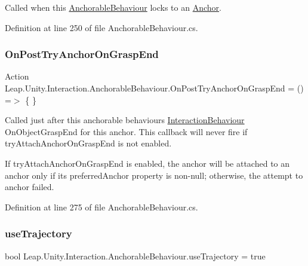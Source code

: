 Called when this \mbox{\hyperlink{class_leap_1_1_unity_1_1_interaction_1_1_anchorable_behaviour}{Anchorable\+Behaviour}} locks to an \mbox{\hyperlink{class_leap_1_1_unity_1_1_interaction_1_1_anchor}{Anchor}}. 



Definition at line 250 of file Anchorable\+Behaviour.\+cs.

\mbox{\label{class_leap_1_1_unity_1_1_interaction_1_1_anchorable_behaviour_a29a27e344ab1105d4fa8657de3fe5dab}} 
\subsubsection{\texorpdfstring{OnPostTryAnchorOnGraspEnd}{OnPostTryAnchorOnGraspEnd}}
{\footnotesize\ttfamily Action Leap.\+Unity.\+Interaction.\+Anchorable\+Behaviour.\+On\+Post\+Try\+Anchor\+On\+Grasp\+End = () =$>$ \{ \}}



Called just after this anchorable behaviour\textquotesingle{}s \mbox{\hyperlink{class_leap_1_1_unity_1_1_interaction_1_1_interaction_behaviour}{Interaction\+Behaviour}} On\+Object\+Grasp\+End for this anchor. This callback will never fire if try\+Attach\+Anchor\+On\+Grasp\+End is not enabled. 

If try\+Attach\+Anchor\+On\+Grasp\+End is enabled, the anchor will be attached to an anchor only if its preferred\+Anchor property is non-\/null; otherwise, the attempt to anchor failed. 

Definition at line 275 of file Anchorable\+Behaviour.\+cs.

\mbox{\label{class_leap_1_1_unity_1_1_interaction_1_1_anchorable_behaviour_ab05fef36f601748387b8a283433909f3}} 
\subsubsection{\texorpdfstring{useTrajectory}{useTrajectory}}
{\footnotesize\ttfamily bool Leap.\+Unity.\+Interaction.\+Anchorable\+Behaviour.\+use\+Trajectory = true}



